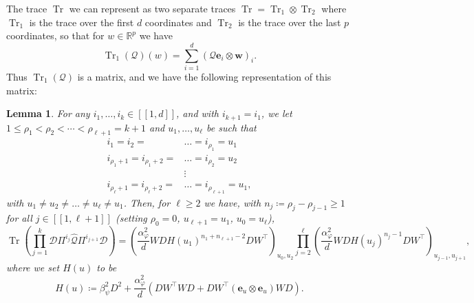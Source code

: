 \documentclass[letterpaper, 10pt, dvipsnames]{article}
\numberwithin{equation}{section}
\DeclareMathOperator{\Tr}{Tr}
\newcommand{\Rbb}{\mathbb{R}}
\newcommand{\D}{\mathcal{D}}
\newcommand{\Q}{\mathcal{Q}}
\newcommand{\ebf}{\mathbf{e}}
\newcommand{\w}{\mathbf{w}}
\renewcommand{\phi}{\varphi}
\newcommand{\unn}[2]{[\![#1,#2]\!]}
\newtheorem{lem}[ccounter]{Lemma}
\theoremstyle{definition}
\begin{document}
The trace $\Tr$ we can represent as two separate traces $\Tr = \Tr_1\otimes \Tr_2$ where $\Tr_1$ is the trace over the first $d$ coordinates and $\Tr_2$ is the trace over the last $p$ coordinates, so that for $w\in \Rbb^p$ we have 
\[
  \Tr_1(\Q)(w) = \sum_{i=1}^d (\Q \ebf_i\otimes \w)_i.
\]
Thus $\Tr_1(\Q)$ is a matrix, and we have the following representation of this matrix:
\begin{lem}\label{lem:TrQrepresentation2}
  For any $i_1,\dots,i_k\in\unn{1}{d}$, and with $i_{k+1}=i_1$, we let $1 \leq \rho_1 < \rho_2 < \cdots < \rho_{\ell+1}=k+1$ and $u_1, \ldots, u_\ell$ be such that 
  \[
  \begin{aligned}
  i_1 = i_2 = &\dots =i_{\rho_1} = u_1 \\
  i_{\rho_1+1} = i_{\rho_1+2} = &\dots = i_{\rho_2} = u_2 \\
  &\vdots \\
  i_{\rho_\ell+1} = i_{\rho_\ell+2} = &\dots = i_{\rho_{\ell+1}} = u_{1},
  \end{aligned}
  \]
  with $u_1 \neq u_2 \neq \dots \neq u_{\ell} \neq u_1$.  Then, for $\ell \geq 2$ we have, with $n_j \coloneqq \rho_j - \rho_{j-1} \geq 1$ for all $j\in\unn{1}{\ell+1}$ (setting $\rho_0=0$, $u_{\ell+1}=u_1$, $u_0=u_{\ell}$),
  \[
  \Tr \left(
    \prod_{j=1}^k \D \Pi^{i_j}\widehat{\Q}\Pi^{i_{j+1}}\D
  \right)
  =
  \left(       \frac{\alpha_\phi^2}{d}
  W D H(u_1)^{n_1+n_{\ell+1}-2} DW^\top \right)_{u_0, u_2}
  \prod_{j=2}^{\ell}
  \left(       \frac{\alpha_\phi^2}{d}
  W D H(u_j)^{n_j-1} DW^\top \right)_{u_{j-1}, u_{j+1}},
  \]
  where we set $H(u)$ to be 
  \[
  H(u) \coloneqq \beta_\psi^2D^2 + \frac{\alpha_\phi^2}{d}\left( DW^\top WD + DW^\top (\ebf_{u} \otimes \ebf_{u}) WD \right).
  \]
\end{lem}
\end{document}
